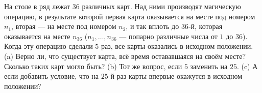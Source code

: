 На столе в ряд лежат $36$ различных карт. Над ними производят магическую операцию, в результате которой первая карта оказывается на месте под номером $n_1$, вторая --- на месте под номером $n_2$, и так вплоть до $36$-й, которая оказывается на месте $n_{36}$ ($n_1, \ldots, n_{36}$ --- попарно различные числа от $1$ до $36$). Когда эту операцию сделали $5$ раз, все карты оказались в исходном положении. (a) Верно ли, что существует карта, всё время остававшаяся на своём месте? Сколько таких карт могло быть? (b) Тот же вопрос, если $5$ заменить на $25$. (c) А если добавить условие, что на $25$-й раз карты впервые окажутся в исходном положении?